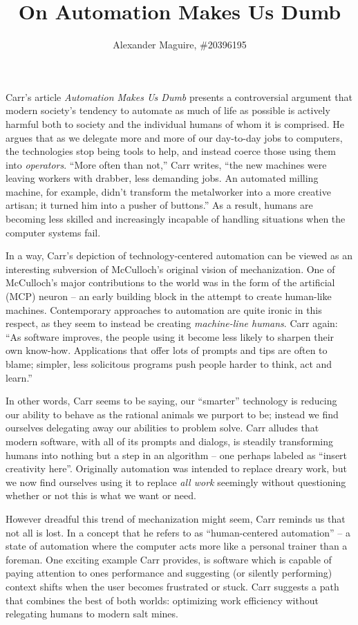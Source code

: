 \documentclass{article}
\title{On Automation Makes Us Dumb}
\author{Alexander Maguire, \#20396195}
\begin{document}
\maketitle

Carr's article \emph{Automation Makes Us Dumb} presents a controversial argument that modern society's tendency to
automate as much of life as possible is actively harmful both to society and the individual humans of whom it is
comprised.  He argues that as we delegate more and more of our day-to-day jobs to computers, the technologies stop being
tools to help, and instead coerce those using them into \emph{operators}. ``More often than not,'' Carr writes, ``the
new machines were leaving workers with drabber, less demanding jobs. An automated milling machine, for example, didn’t
transform the metalworker into a more creative artisan; it turned him into a pusher of buttons.\cite{carr}'' As a
result, humans are becoming less skilled and increasingly incapable of handling situations when the computer systems
fail.

In a way, Carr's depiction of technology-centered automation can be viewed as an interesting subversion of McCulloch's
original vision of mechanization. One of McCulloch's major contributions to the world was in the form of the artificial
(MCP) neuron -- an early building block in the attempt to create human-like machines\cite{mcculloch}. Contemporary approaches to
automation are quite ironic in this respect, as they seem to instead be creating \emph{machine-line humans}. Carr
again: ``As software improves, the people using it become less likely to sharpen their own know-how. Applications that
offer lots of prompts and tips are often to blame; simpler, less solicitous programs push people harder to think, act
and learn.\cite{carr}''

In other words, Carr seems to be saying, our ``smarter'' technology is reducing our ability to behave as the rational
animals we purport to be; instead we find ourselves delegating away our abilities to problem solve.  Carr alludes that
modern software, with all of its prompts and dialogs, is steadily transforming humans into nothing but a step in an
algorithm -- one perhaps labeled as ``insert creativity here''. Originally automation was intended to replace dreary
work, but we now find ourselves using it to replace \emph{all work} seemingly without questioning whether or not this is
what we want or need.

However dreadful this trend of mechanization might seem, Carr reminds us that not all is lost. In a concept that he
refers to as ``human-centered automation'' -- a state of automation where the computer acts more like a personal trainer
than a foreman. One exciting example Carr provides, is software which is capable of paying attention to ones performance
and suggesting (or silently performing) context shifts when the user becomes frustrated or stuck. Carr suggests a path
that combines the best of both worlds: optimizing work efficiency without relegating humans to modern salt mines.
\end{document}
